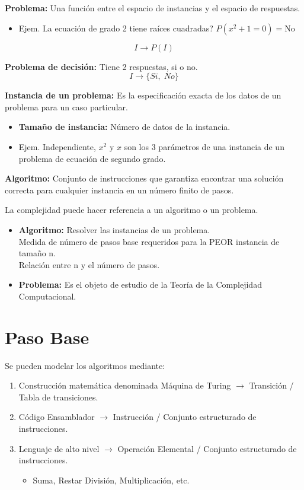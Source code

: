 \textbf{Problema:} Una función entre el espacio de instancias y el espacio de respuestas.
\begin{itemize}
	\item Ejem. La ecuación de grado 2 tiene raíces cuadradas? $P(x^2+1=0)=\text{No}$
\end{itemize}
$$I \rightarrow P(I)$$

\textbf{Problema de decisión:} Tiene 2 respuestas, si o no. $$I \rightarrow \{Si,\; No\}$$
\pagebreak

\textbf{Instancia de un problema:} Es la especificación exacta de los datos de un problema para un caso particular.
\begin{itemize}
	\item \textbf{Tamaño de instancia:} Número de datos de la instancia.
	\item Ejem. Independiente, $x^2$ y $x$ son los 3 parámetros de una instancia de un problema de ecuación de segundo grado.
\end{itemize}

\textbf{Algoritmo:} Conjunto de instrucciones que garantiza encontrar una solución correcta para cualquier instancia en un número finito de pasos.

La complejidad puede hacer referencia a un algoritmo o un problema.
\begin{itemize}
	\item \textbf{Algoritmo:} Resolver las instancias de un problema. \\ Medida de número de pasos base requeridos para la PEOR instancia de tamaño n. \\ Relación entre n y el número de pasos.
	\item \textbf{Problema:} Es el objeto de estudio de la Teoría de la Complejidad Computacional.
\end{itemize}

\section{Paso Base}\label{sec:paso-base}
Se pueden modelar los algoritmos mediante:
\begin{enumerate}
	\item Construcción matemática denominada Máquina de Turing $\rightarrow$ Transición / Tabla de transiciones.
	\item Código Ensamblador $\rightarrow$ Instrucción / Conjunto estructurado de instrucciones.
	\item Lenguaje de alto nivel $\rightarrow$ Operación Elemental / Conjunto estructurado de instrucciones.
	      \begin{itemize}
		      \item Suma, Restar División, Multiplicación, etc.
	      \end{itemize}
\end{enumerate}

